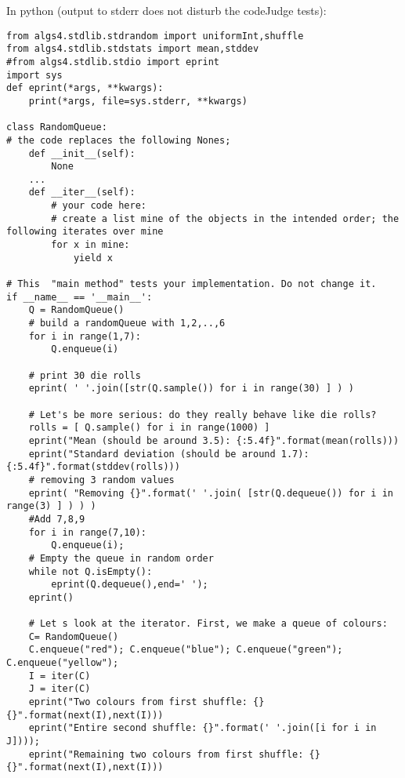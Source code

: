 \documentclass{tufte-handout}
\begin{document}
In python (output to stderr does not disturb the codeJudge tests):
\begin{verbatim}
from algs4.stdlib.stdrandom import uniformInt,shuffle
from algs4.stdlib.stdstats import mean,stddev
#from algs4.stdlib.stdio import eprint
import sys
def eprint(*args, **kwargs):
    print(*args, file=sys.stderr, **kwargs)

class RandomQueue:
# the code replaces the following Nones; 
    def __init__(self):
        None
    ...
    def __iter__(self):
        # your code here:
        # create a list mine of the objects in the intended order; the following iterates over mine
        for x in mine:
            yield x

# This  "main method" tests your implementation. Do not change it.
if __name__ == '__main__':
    Q = RandomQueue()
    # build a randomQueue with 1,2,..,6
    for i in range(1,7):
        Q.enqueue(i)
        
    # print 30 die rolls
    eprint( ' '.join([str(Q.sample()) for i in range(30) ] ) )

    # Let's be more serious: do they really behave like die rolls?
    rolls = [ Q.sample() for i in range(1000) ]
    eprint("Mean (should be around 3.5): {:5.4f}".format(mean(rolls)))
    eprint("Standard deviation (should be around 1.7): {:5.4f}".format(stddev(rolls)))
    # removing 3 random values
    eprint( "Removing {}".format(' '.join( [str(Q.dequeue()) for i in range(3) ] ) ) )    
    #Add 7,8,9
    for i in range(7,10):
        Q.enqueue(i); 
    # Empty the queue in random order
    while not Q.isEmpty():
        eprint(Q.dequeue(),end=' ');
    eprint()

    # Let s look at the iterator. First, we make a queue of colours:
    C= RandomQueue()
    C.enqueue("red"); C.enqueue("blue"); C.enqueue("green"); C.enqueue("yellow"); 
    I = iter(C)
    J = iter(C)
    eprint("Two colours from first shuffle: {} {}".format(next(I),next(I)))
    eprint("Entire second shuffle: {}".format(' '.join([i for i in J])));
    eprint("Remaining two colours from first shuffle: {} {}".format(next(I),next(I)))
\end{verbatim}
\end{document}
